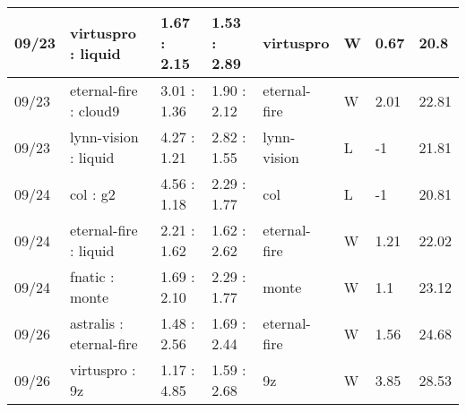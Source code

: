 \begin{small}
\begin{longtable}{|l|l|l|l|l|l|l|l|}
	09/23                               & virtuspro : liquid                  & 1.67 : 2.15                             & 1.53 : 2.89                             & virtuspro                         & W                                 & 0.67                                 & 20.8                              \\ \hline
	09/23                               & eternal-fire : cloud9               & 3.01 : 1.36                             & 1.90 : 2.12                             & eternal-fire                      & W                                 & 2.01                                 & 22.81                             \\ \hline
	09/23                               & lynn-vision : liquid                & 4.27 : 1.21                             & 2.82 : 1.55                             & lynn-vision                       & L                                 & -1                                   & 21.81                             \\ \hline
	09/24                               & col : g2                            & 4.56 : 1.18                             & 2.29 : 1.77                             & col                               & L                                 & -1                                   & 20.81                             \\ \hline
	09/24                               & eternal-fire : liquid               & 2.21 : 1.62                             & 1.62 : 2.62                             & eternal-fire                      & W                                 & 1.21                                 & 22.02                             \\ \hline
	09/24                               & fnatic : monte                      & 1.69 : 2.10                             & 2.29 : 1.77                             & monte                             & W                                 & 1.1                                  & 23.12                             \\ \hline
	09/26                               & astralis : eternal-fire             & 1.48 : 2.56                             & 1.69 : 2.44                             & eternal-fire                      & W                                 & 1.56                                 & 24.68                             \\ \hline
	09/26                               & virtuspro : 9z                      & 1.17 : 4.85                             & 1.59 : 2.68                             & 9z                                & W                                 & 3.85                                 & 28.53                             \\ \hline

\end{longtable}
\end{small}
